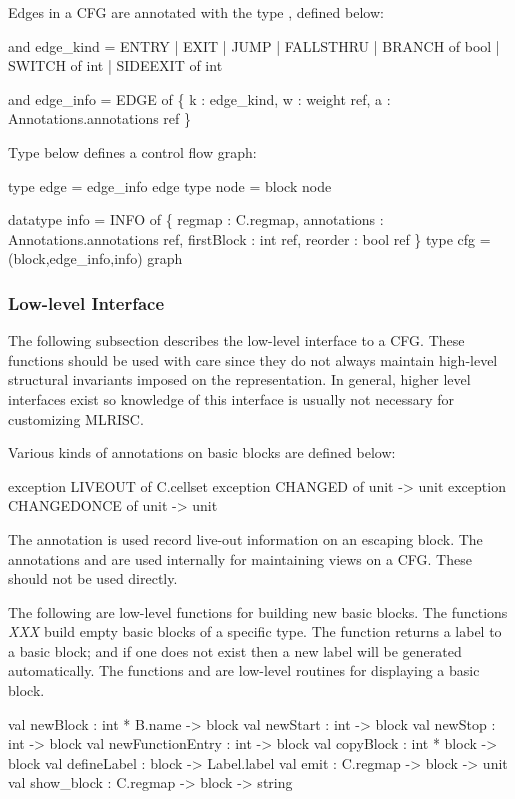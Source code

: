 Edges in a CFG are annotated with the type ,
defined below:
\begin{SML}
   and edge_kind = ENTRY           
                 | EXIT           
                 | JUMP          
                 | FALLSTHRU     
                 | BRANCH of bool
                 | SWITCH of int 
                 | SIDEEXIT of int 

   and edge_info = 
       EDGE of \{ k : edge_kind,                 
                 w : weight ref,               
                 a : Annotations.annotations ref
               \}
\end{SML}

Type  below defines a control flow graph:
\begin{SML}
   type edge = edge_info edge
   type node = block node

   datatype info = 
       INFO of \{ regmap      : C.regmap,
                 annotations : Annotations.annotations ref,
                 firstBlock  : int ref,
                 reorder     : bool ref
               \}
   type cfg = (block,edge_info,info) graph
\end{SML}

\subsubsection{Low-level Interface}
   The following subsection describes the low-level interface to a CFG.
These functions should be used with care since they do not
always maintain high-level structural invariants imposed on
the representation.  In general, higher level interfaces exist
so knowledge of this interface is usually not necessary for customizing
MLRISC. 
   
   Various kinds of annotations on basic blocks are defined below:
\begin{SML}
   exception LIVEOUT of C.cellset   
   exception CHANGED of unit -> unit
   exception CHANGEDONCE of unit -> unit
\end{SML}
The annotation  is used record live-out information
on an escaping block.
The annotations  and  are used
internally for maintaining views on a CFG.  These should not be used
directly. 

    The following are low-level functions for building new basic blocks.
The functions \emph{XXX} build empty basic blocks of a specific
type.  The function  returns a label to a basic block;
and if one does not exist then a new label will be generated automatically.
The functions  and  are low-level
routines for displaying a basic block.
\begin{SML}
   val newBlock          : int * B.name -> block      
   val newStart          : int -> block              
   val newStop           : int -> block             
   val newFunctionEntry  : int -> block            
   val copyBlock         : int * block -> block   
   val defineLabel       : block -> Label.label  
   val emit              : C.regmap -> block -> unit
   val show_block        : C.regmap -> block -> string 
\end{SML}

